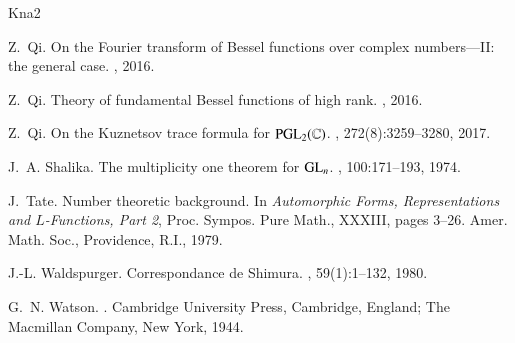 \documentclass{amsproc}
\theoremstyle{plain}
\numberwithin{equation}{section}
\begin{document}
\begin{thebibliography}{Kna2}
	
	Z.~Qi.
	\newblock On the {F}ourier transform of {B}essel functions over complex
	numbers---{II}: the general case.
	, 2016.
	
	Z.~Qi.
	\newblock Theory of fundamental {B}essel functions of high rank.
	, 2016.
	
	Z.~Qi.
	\newblock On the {K}uznetsov trace formula for {$\mathrm{PGL}_2(\Bbb{C})$}.
	, 272(8):3259--3280, 2017.
	
	J.~A. Shalika.
	\newblock The multiplicity one theorem for {${\rm GL}_{n}$}.
	, 100:171--193, 1974.
	
	J.~Tate.
	\newblock Number theoretic background.
	\newblock In {\em Automorphic {F}orms, {R}epresentations and {$L$}-{F}unctions,
		{P}art 2}, Proc. Sympos. Pure Math., XXXIII, pages 3--26. Amer. Math. Soc.,
	Providence, R.I., 1979.
	
	J.-L. Waldspurger.
	\newblock Correspondance de {S}himura.
	, 59(1):1--132, 1980.
	
	G.~N. Watson.
	.
	\newblock Cambridge University Press, Cambridge, England; The Macmillan
	Company, New York, 1944.
	
\end{thebibliography}

	
\end{document}
